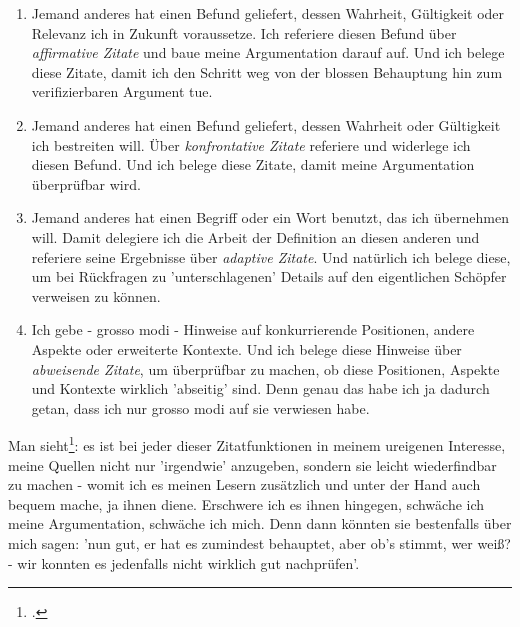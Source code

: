 \begin{enumerate}
  \item Jemand anderes hat einen Befund geliefert, dessen Wahrheit, Gültigkeit
  oder Relevanz ich in Zukunft voraussetze. Ich referiere diesen Befund über
  \emph{affirmative Zitate} und baue meine Argumentation darauf auf. Und ich
  belege diese Zitate, damit ich den Schritt weg von der blossen Behauptung hin
  zum verifizierbaren Argument tue.
  \item Jemand anderes hat einen Befund geliefert, dessen Wahrheit oder
  Gültigkeit ich bestreiten will. Über \emph{konfrontative Zitate} referiere und
  widerlege ich diesen Befund. Und ich belege diese Zitate, damit meine
  Argumentation überprüfbar wird.
  \item Jemand anderes hat einen Begriff oder ein Wort benutzt, das ich
  übernehmen will. Damit delegiere ich die Arbeit der Definition an diesen
  anderen und referiere seine Ergebnisse über \emph{adaptive Zitate}. Und
  natürlich ich belege diese, um bei Rückfragen zu 'unterschlagenen' Details auf
  den eigentlichen Schöpfer verweisen zu können.
  \item Ich gebe - grosso modi - Hinweise auf konkurrierende Positionen, andere
  Aspekte oder erweiterte Kontexte. Und ich belege diese Hinweise über
  \emph{abweisende Zitate}, um überprüfbar zu machen, ob diese Positionen,
  Aspekte und Kontexte wirklich 'abseitig' sind. Denn genau das habe ich ja
  dadurch getan, dass ich nur grosso modi auf sie verwiesen habe.
\end{enumerate}

Man sieht\footcite[vgl. dazu auch][\nopage hier werden im Abschnitt
'Wissenschaft' drei Funktionen aufgelistet. Das, was ich als 'affirmatives
Zitat' bezeichne, läuft - unter dem Schlagwort 'auf den Schultern von Riesen' -
als Redundanzreduktion, gepaart mit der Überprüfbarkeit. Außerden wird die Moral
ins Feld geführt]{Wikipedia2011a}: es ist bei jeder dieser Zitatfunktionen in
meinem ureigenen Interesse, meine Quellen nicht nur 'irgendwie' anzugeben,
sondern sie leicht wiederfindbar zu machen - womit ich es meinen Lesern
zusätzlich und unter der Hand auch bequem mache, ja ihnen diene. Erschwere ich
es ihnen hingegen, schwäche ich meine Argumentation, schwäche ich mich. Denn
dann könnten sie bestenfalls über mich sagen: 'nun gut, er hat es zumindest
behauptet, aber ob's stimmt, wer weiß? - wir konnten es jedenfalls nicht
wirklich gut nachprüfen'.

